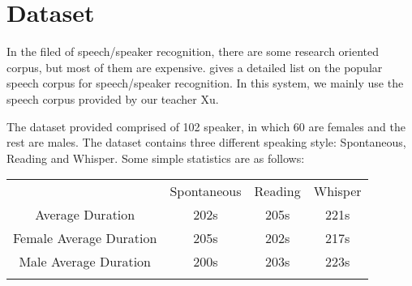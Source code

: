 \section{Dataset}
\label{sec:data}
  In the filed of speech/speaker recognition, there are some research oriented
  corpus, but most of them are expensive. \cite{database} gives a detailed list on the
  popular speech corpus for speech/speaker recognition. In this system,
  we mainly use the speech corpus provided by our teacher Xu.

	The dataset provided comprised of 102 speaker, in which 60 are
	females and the rest are males.
    The dataset contains three different speaking style: Spontaneous,
	Reading and Whisper. Some simple statistics are as follows:
	\begin{table}[!ht]
		\centering
		\begin{tabular}{|c|c|c|c|}
			\shline
			& Spontaneous & Reading & Whisper \\\shline
			Average Duration & 202s & 205s & 221s \\\hline
			Female Average Duration & 205s & 202s & 217s \\\hline
			Male Average Duration & 200s & 203s & 223s \\\shline
		\end{tabular}
	\end{table}
